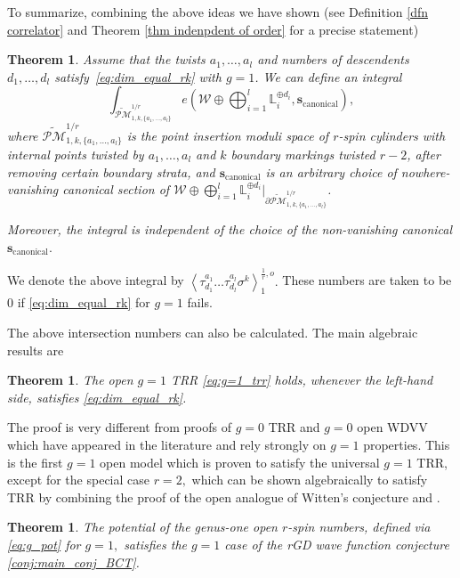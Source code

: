 \documentclass[11pt]{amsart}
\newtheorem{thm}[dummy]{Theorem}
\theoremstyle{definition}
\theoremstyle{remark}
\newcommand{\<}{\left<}
\renewcommand{\>}{\right>}
\numberwithin{equation}{section}
\begin{document}
To summarize, combining the above ideas we have shown (see Definition \ref{dfn correlator} and Theorem \ref{thm indenpdent of order} for a %
precise statement)
\begin{thm}\label{thm:int_nums_well_def}
Assume %
that the twists $a_1,\ldots,a_l$ and numbers of descendents $d_1,\ldots,d_l$ satisfy~\eqref{eq:dim_equal_rk} with $g=1$. We can define an integral
\[\int_{\widetilde{\mathcal{PM}}^{1/r}_{1,k,\{a_1, \ldots, a_l\}}} e\left( \mathcal{W} \oplus \bigoplus_{i=1}^l \mathbb{L}_i^{\oplus d_i}, \mathbf{s}_{\text{canonical}}\right),
\]
where ${\widetilde{\mathcal{PM}}^{1/r}_{1,k,\{a_1, \ldots, a_l\}}}$ is the point insertion moduli space of $r$-spin cylinders with internal points twisted by $a_1,\ldots,a_l$ and $k$ boundary markings twisted $r-2$, after removing certain boundary strata, and $\mathbf{s}_{\text{canonical}}$ is an arbitrary choice of nowhere-vanishing canonical section %
of $\mathcal{W} \oplus \bigoplus_{i=1}^l\mathbb{L}_i^{\oplus d_i}|_{\partial{\widetilde{\mathcal{PM}}^{1/r}_{1,k,\{a_1, \ldots, a_l\}}}}$. %

Moreover, the integral is independent of the choice of the non-vanishing canonical $\mathbf{s}_{\text{canonical}}.$ 
\end{thm}
We denote the above integral by $\left\langle\tau_{d_1}^{a_1}\ldots\tau^{a_l}_{d_l}\sigma^k\right\rangle^{\frac{1}{r},o}_1.$
These numbers are taken to be $0$ if \eqref{eq:dim_equal_rk} for $g=1$ fails.

The above intersection numbers can also be calculated. The main algebraic %
results are
\begin{thm}\label{thm:trr_g1}
The %
open $g=1$ TRR \eqref{eq:g=1_trr} holds, whenever the left-hand side, satisfies \eqref{eq:dim_equal_rk}.
\end{thm}
The proof is very different from proofs of $g=0$ TRR and $g=0$ open WDVV which have appeared in the literature \cite{PST14,BCT2,TZ2,solomon2023relative} %
and rely strongly %
on $g=1$ properties.
This is the first $g=1$ open model which is proven to satisfy the universal $g=1$ TRR, except for the special case $r=2,$ which can be shown algebraically to satisfy TRR by combining the proof of the open analogue of Witten's conjecture \cite{BT17} and \cite[Theorem 1]{BCT3}.
\begin{thm}\label{thm:wave_func}
    The potential of the genus-one open $r$-spin numbers, defined via \eqref{eq:g_pot} for $g=1,$ satisfies the $g=1$ case of the rGD wave function conjecture \ref{conj:main_conj_BCT}.
\end{thm}
\end{document}
